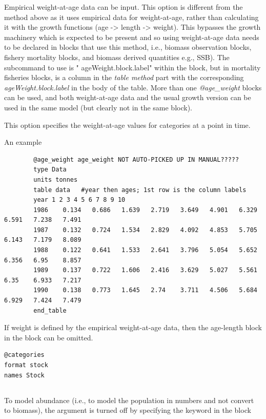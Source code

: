 Empirical weight-at-age data can be input. This option is different from the method above as it uses empirical data for weight-at-age, rather than calculating it with the growth functions (age -> length -> weight). This bypasses the  growth machinery which is expected to be present and so using weight-at-age data  needs to be declared in blocks that use this method, i.e., biomass observation blocks, fishery mortality blocks, and biomass derived quantities e.g., SSB). The subcommand to use is " ageWeight.block.label" within the block, but in mortality fisheries blocks,  is a column in the \textit{table method} part with the corresponding \textit{ageWeight.block.label} in the body of the table. More than one \textit{@age\_weight} blocks can be used, and both  weight-at-age data and the usual growth version can be used in the same model (but clearly not in the same block).

This option specifies the weight-at-age values for categories at a point in time. 

An example

{\small{\begin{verbatim}
		@age_weight age_weight NOT AUTO-PICKED UP IN MANUAL?????
		type Data
		units tonnes
		table data   #year then ages; 1st row is the column labels
		year 1 2 3 4 5 6 7 8 9 10
		1986	0.134	0.686	1.639	2.719	3.649	4.901	6.329	6.591	7.238	7.491
		1987	0.132	0.724	1.534	2.829	4.092	4.853	5.705	6.143	7.179	8.089
		1988	0.122	0.641	1.533	2.641	3.796	5.054	5.652	6.356	6.95	8.857
		1989	0.137	0.722	1.606	2.416	3.629	5.027	5.561	6.35	6.933	7.217
		1990	0.138	0.773	1.645	2.74	3.711	4.506	5.684	6.929	7.424	7.479
		end_table
\end{verbatim}}}

If weight is defined by the empirical weight-at-age data, then the age-length block in the  block can be omitted.

{\small{\begin{verbatim}
@categories
format stock
names Stock
\end{verbatim}}}


\subsection{\label{sec:weightless-model}}

To model abundance (i.e., to model the population in numbers and not convert to biomass), the  argument is turned off by specifying the keyword  in the  block

